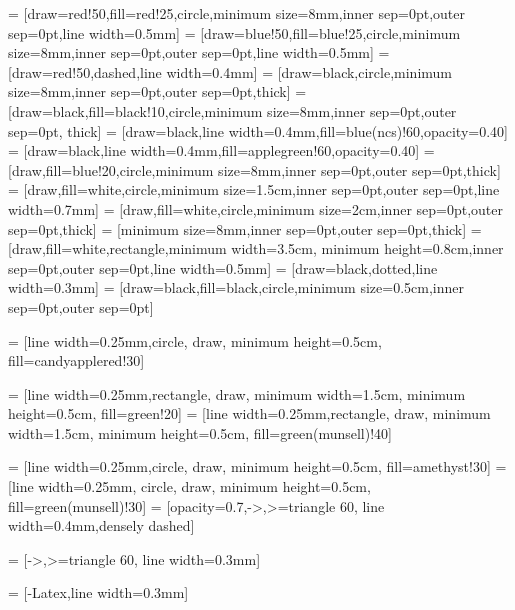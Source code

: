                    = [draw=red!50,fill=red!25,circle,minimum size=8mm,inner sep=0pt,outer sep=0pt,line width=0.5mm]
                = [draw=blue!50,fill=blue!25,circle,minimum size=8mm,inner sep=0pt,outer sep=0pt,line width=0.5mm]
             = [draw=red!50,dashed,line width=0.4mm]
               = [draw=black,circle,minimum size=8mm,inner sep=0pt,outer sep=0pt,thick]
               = [draw=black,fill=black!10,circle,minimum size=8mm,inner sep=0pt,outer sep=0pt, thick]
         = [draw=black,line width=0.4mm,fill=blue(ncs)!60,opacity=0.40]
         = [draw=black,line width=0.4mm,fill=applegreen!60,opacity=0.40]
                    = [draw,fill=blue!20,circle,minimum size=8mm,inner sep=0pt,outer sep=0pt,thick]
          = [draw,fill=white,circle,minimum size=1.5cm,inner sep=0pt,outer sep=0pt,line width=0.7mm]
          = [draw,fill=white,circle,minimum size=2cm,inner sep=0pt,outer sep=0pt,thick]
               = [minimum size=8mm,inner sep=0pt,outer sep=0pt,thick]
             = [draw,fill=white,rectangle,minimum width=3.5cm, minimum height=0.8cm,inner sep=0pt,outer sep=0pt,line width=0.5mm]
                 = [draw=black,dotted,line width=0.3mm]
             = [draw=black,fill=black,circle,minimum size=0.5cm,inner sep=0pt,outer sep=0pt]

 = [line width=0.25mm,circle, draw, minimum height=0.5cm, fill=candyapplered!30]

 = [line width=0.25mm,rectangle, draw, minimum width=1.5cm, minimum height=0.5cm, fill=green!20]
= [line width=0.25mm,rectangle, draw, minimum width=1.5cm, minimum height=0.5cm, fill=green(munsell)!40]

 = [line width=0.25mm,circle, draw, minimum height=0.5cm, fill=amethyst!30]
 = [line width=0.25mm, circle, draw, minimum height=0.5cm, fill=green(munsell)!30]
 = [opacity=0.7,->,>=triangle 60, line width=0.4mm,densely dashed]

 = [->,>=triangle 60, line width=0.3mm]

 = [-Latex,line width=0.3mm]

